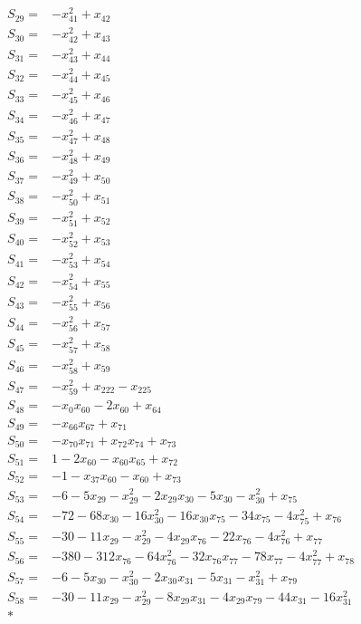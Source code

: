 \begin{align*}
S_{29}={}&-x_{41}^{2}+x_{42}\\[3pt]
S_{30}={}&-x_{42}^{2}+x_{43}\\[3pt]
S_{31}={}&-x_{43}^{2}+x_{44}\\[3pt]
S_{32}={}&-x_{44}^{2}+x_{45}\\[3pt]
S_{33}={}&-x_{45}^{2}+x_{46}\\[3pt]
S_{34}={}&-x_{46}^{2}+x_{47}\\[3pt]
S_{35}={}&-x_{47}^{2}+x_{48}\\[3pt]
S_{36}={}&-x_{48}^{2}+x_{49}\\[3pt]
S_{37}={}&-x_{49}^{2}+x_{50}\\[3pt]
S_{38}={}&-x_{50}^{2}+x_{51}\\[3pt]
S_{39}={}&-x_{51}^{2}+x_{52}\\[3pt]
S_{40}={}&-x_{52}^{2}+x_{53}\\[3pt]
S_{41}={}&-x_{53}^{2}+x_{54}\\[3pt]
S_{42}={}&-x_{54}^{2}+x_{55}\\[3pt]
S_{43}={}&-x_{55}^{2}+x_{56}\\[3pt]
S_{44}={}&-x_{56}^{2}+x_{57}\\[3pt]
S_{45}={}&-x_{57}^{2}+x_{58}\\[3pt]
S_{46}={}&-x_{58}^{2}+x_{59}\\[3pt]
S_{47}={}&-x_{59}^{2}+x_{222}-x_{225}\\[3pt]
S_{48}={}&-x_{0}x_{60}-2x_{60}+x_{64}\\[3pt]
S_{49}={}&-x_{66}x_{67}+x_{71}\\[3pt]
S_{50}={}&-x_{70}x_{71}+x_{72}x_{74}+x_{73}\\[3pt]
S_{51}={}&1-2x_{60}-x_{60}x_{65}+x_{72}\\[3pt]
S_{52}={}&-1-x_{37}x_{60}-x_{60}+x_{73}\\[3pt]
S_{53}={}&-6-5x_{29}-x_{29}^{2}-2x_{29}x_{30}-5x_{30}-x_{30}^{2}+x_{75}\\[3pt]
S_{54}={}&-72-68x_{30}-16x_{30}^{2}-16x_{30}x_{75}-34x_{75}-4x_{75}^{2}+x_{76}\\[3pt]
S_{55}={}&-30-11x_{29}-x_{29}^{2}-4x_{29}x_{76}-22x_{76}-4x_{76}^{2}+x_{77}\\[3pt]
S_{56}={}&-380-312x_{76}-64x_{76}^{2}-32x_{76}x_{77}-78x_{77}-4x_{77}^{2}+x_{78}\\[3pt]
S_{57}={}&-6-5x_{30}-x_{30}^{2}-2x_{30}x_{31}-5x_{31}-x_{31}^{2}+x_{79}\\[3pt]
S_{58}={}&-30-11x_{29}-x_{29}^{2}-8x_{29}x_{31}-4x_{29}x_{79}-44x_{31}-16x_{31}^{2}\\*

\end{align*}
